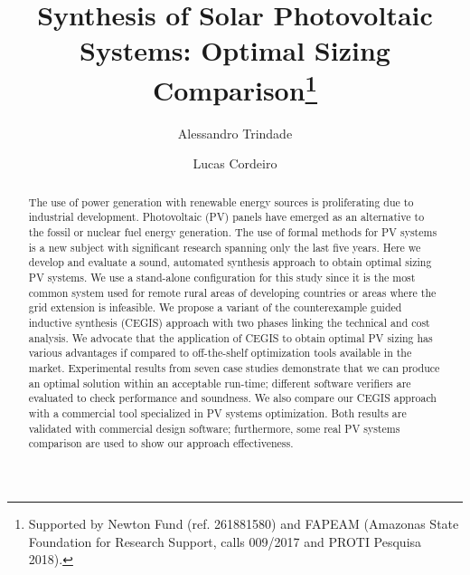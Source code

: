 \documentclass[runningheads]{llncs}
\begin{document}
%
\title{Synthesis of Solar Photovoltaic Systems: Optimal Sizing Comparison\thanks{Supported by Newton Fund (ref. 261881580) and FAPEAM (Amazonas State Foundation for Research Support, calls 009/2017 and PROTI Pesquisa 2018).}}
%
%
\author{Alessandro Trindade \and Lucas Cordeiro} %
%
%
\maketitle       %


\begin{abstract}
The use of power generation with renewable energy sources is proliferating due to industrial development. Photovoltaic (PV) panels have emerged as an alternative to the fossil or nuclear fuel energy generation. The use of formal methods for PV systems is a new subject with significant research spanning only the last five years. Here we develop and evaluate a sound, automated synthesis approach to obtain optimal sizing PV systems. We use a stand-alone configuration for this study since it is the most common system used for remote rural areas of developing countries or areas where the grid extension is infeasible. We propose a variant of the counterexample guided inductive synthesis (CEGIS) approach with two phases linking the technical and cost analysis. We advocate that the application of CEGIS to obtain optimal PV sizing has various advantages if compared to off-the-shelf optimization tools available in the market. Experimental results from seven case studies demonstrate that we can produce an optimal solution within an acceptable run-time; different software verifiers are evaluated to check performance and soundness. We also compare our CEGIS approach with a commercial tool specialized in PV systems optimization. Both results are validated with commercial design software; furthermore, some real PV systems comparison are used to show our approach effectiveness. 
\end{abstract}
\end{document}
